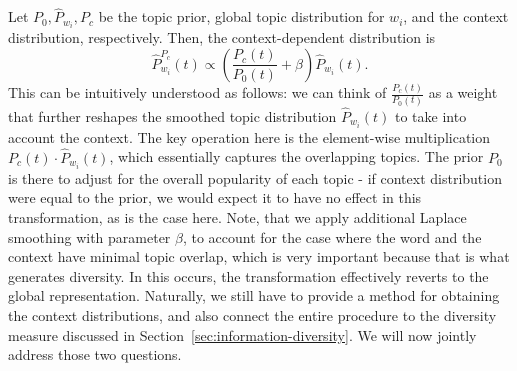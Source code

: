 \bed\label{context}
Let $P_0,\widehat{P}_{w_i}, P_c$ be the topic prior, global
topic distribution for $w_i$, and the context distribution,
respectively. Then, the context-dependent distribution is
\begin{equation*}
\widehat{P}^{P_c}_{w_i}(t)\propto \left(\frac{P_c(t)}{P_0(t)} + \beta\right)\widehat{P}_{w_i}(t).
\end{equation*}
\eed
This can be intuitively understood as follows:
we can think of $\frac{P_c(t)}{P_0(t)}$ as a weight
that further reshapes the smoothed topic distribution $\widehat{P}_{w_i}(t)$
to take into account the context. The key operation here is the
element-wise multiplication $P_c(t)\cdot\widehat{P}_{w_i}(t)$, which
essentially captures the overlapping topics. The prior $P_0$ is there
to adjust for the overall popularity of each topic - if context
distribution were equal to the prior, we would expect it to have no effect in
this transformation, as is the case here. Note, that we apply additional
Laplace smoothing with parameter $\beta$, to account for the case where
the word and the context have minimal topic overlap, which is very
important because that is what generates diversity. In this occurs,
the transformation effectively reverts to the global representation. Naturally, we still
have to provide a method for obtaining the context distributions, and
also connect the entire procedure to the diversity measure discussed in
Section~\ref{sec:information-diversity}. We will now jointly address
those two questions.



